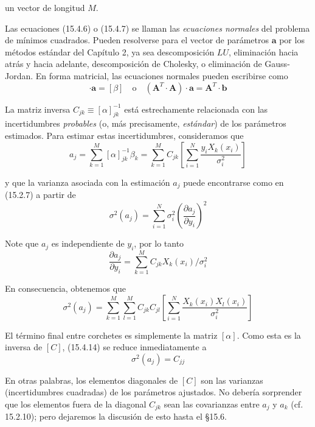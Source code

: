 \documentclass[10pt,a4paper]{book}
\begin{document}
un vector de longitud $M$.

Las ecuaciones (15.4.6) o (15.4.7) se llaman las \textit{ecuaciones normales} del problema de mínimos cuadrados. Pueden resolverse para el vector de parámetros $\mathbf{a}$ por los métodos estándar del Capítulo 2, ya sea descomposición $LU$, eliminación hacia atrás y hacia adelante, descomposición de Cholesky, o eliminación de Gauss-Jordan. En forma matricial, las ecuaciones normales pueden escribirse como
\begin{equation}
[\alpha] \cdot \mathbf{a} = [\beta] \quad \text{o} \quad (\mathbf{A}^T \cdot \mathbf{A}) \cdot \mathbf{a} = \mathbf{A}^T \cdot \mathbf{b}
\end{equation}

La matriz inversa $C_{jk} \equiv [\alpha]^{-1}_{jk}$ está estrechamente relacionada con las incertidumbres \textit{probables} (o, más precisamente, \textit{estándar}) de los parámetros estimados. Para estimar estas incertidumbres, consideramos que
\begin{equation}
a_j = \sum_{k=1}^{M} [\alpha]^{-1}_{jk} \beta_k = \sum_{k=1}^{M} C_{jk} \left[ \sum_{i=1}^{N} \frac{y_i X_k(x_i)}{\sigma_i^2} \right]
\end{equation}

y que la varianza asociada con la estimación $a_j$ puede encontrarse como en (15.2.7) a partir de
\begin{equation}
\sigma^2(a_j) = \sum_{i=1}^{N} \sigma_i^2 \left( \frac{\partial a_j}{\partial y_i} \right)^2
\end{equation}

Note que $a_j$ es independiente de $y_i$, por lo tanto
\begin{equation}
\frac{\partial a_j}{\partial y_i} = \sum_{k=1}^{M} C_{jk} X_k(x_i) / \sigma_i^2
\end{equation}

En consecuencia, obtenemos que
\begin{equation}
\sigma^2(a_j) = \sum_{k=1}^{M} \sum_{l=1}^{M} C_{jk} C_{jl} \left[ \sum_{i=1}^{N} \frac{X_k(x_i) X_l(x_i)}{\sigma_i^2} \right]
\end{equation}

El término final entre corchetes es simplemente la matriz $[\alpha]$. Como esta es la inversa de $[C]$, (15.4.14) se reduce inmediatamente a
\begin{equation}
\sigma^2(a_j) = C_{jj}
\end{equation}

En otras palabras, los elementos diagonales de $[C]$ son las varianzas (incertidumbres cuadradas) de los parámetros ajustados. No debería sorprender que los elementos fuera de la diagonal $C_{jk}$ sean las covarianzas entre $a_j$ y $a_k$ (cf. 15.2.10); pero dejaremos la discusión de esto hasta el §15.6.
\end{document}

